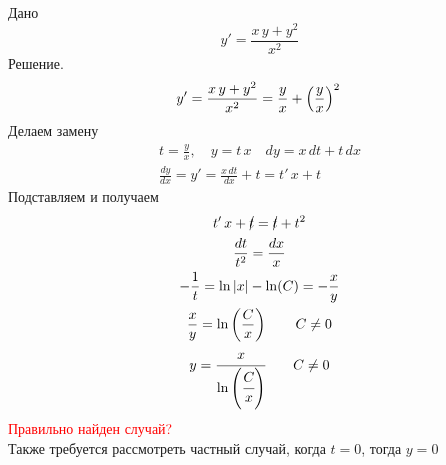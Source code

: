 \begin{Example}
    Дано
    \[
        y' = \frac{x\,y + y^2}{x^2}
    \]
    Решение.
    \[
        y' = \frac{x\,y + y^2}{x^2} = \frac{y}{x} + \left(\frac{y}{x}\right)^2\\
    \]
    Делаем замену
    \begin{gather*}
            t = \frac{y}{x}, \quad y = t\,x \quad dy = x\,dt + t\,dx\\
            \frac{dy}{dx} = y' = \frac{x\,dt}{dx} + t = t'\,x + t
    \end{gather*}
    Подставляем и получаем
    \begin{gather*}    
        t'\,x + \cancel{t} = \cancel{t} + t^2\\
        \frac{dt}{t^2} = \frac{dx}{x}\\
        -\frac{1}{t} = \ln|x| - \ln(C) = - \frac{x}{y}\\
        \frac{x}{y} = \ln\left(\frac{C}{x}\right) \qquad C \neq 0\\
        y = \cfrac{x}{\ln\left(\cfrac{C}{x}\right)} \qquad C \neq 0
    \end{gather*}
    \textcolor{red}{Правильно найден случай?}\\
    Также требуется рассмотреть частный случай, когда $t = 0$, тогда $y = 0$
\end{Example}


